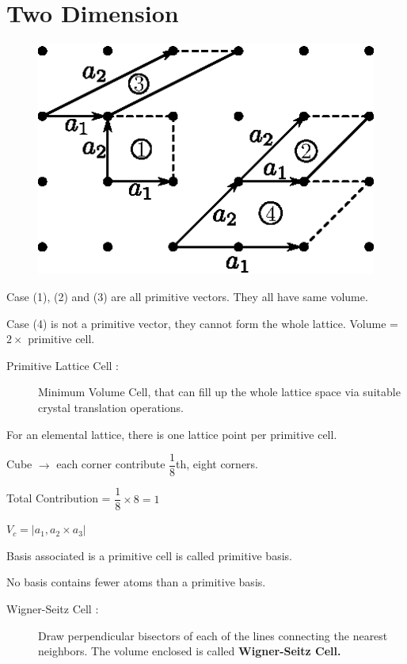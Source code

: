 \section*{Two Dimension}
\begin{figure}[H]
\centering
\includegraphics{images/lecture2/fig2.eps}
\end{figure}
Case (1), (2) and (3) are all primitive vectors. They all have same volume.

\smallskip

\noindent
Case (4) is not a primitive vector, they cannot form the whole lattice. Volume = $2\times{}$ primitive cell.
\begin{description}
\item[Primitive Lattice Cell :] Minimum Volume Cell, that can fill up the whole lattice space via suitable crystal translation operations.
\end{description}

For an elemental lattice, there is one lattice point per primitive cell.

Cube $\to$ each corner contribute $\dfrac{1}{8}$th, eight corners.

Total Contribution = $\dfrac{1}{8}\times 8=1$

$V_{c}=|a_{1},a_{2}\times a_{3}|$

Basis associated is a primitive cell is called primitive basis.

No basis contains fewer atoms than a primitive basis.
\begin{description}
\item[Wigner-Seitz Cell :] Draw perpendicular bisectors of each of the lines connecting the nearest neighbors. The volume enclosed is called {\bf Wigner-Seitz Cell.}
\end{description}

